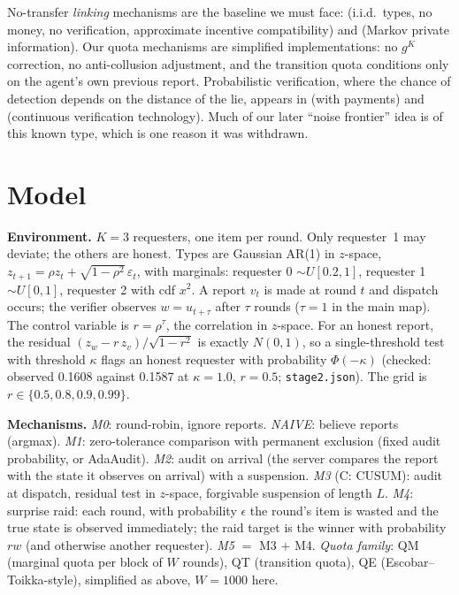 \documentclass[10pt]{article}
\begin{document}
No-transfer \emph{linking} mechanisms are the baseline we must face: \citet{jackson2007} (i.i.d.\ types, no money, no verification, approximate incentive compatibility) and \citet{escobar2013} (Markov private information). Our quota mechanisms are simplified implementations: no $g^K$ correction, no anti-collusion adjustment, and the transition quota conditions only on the agent's own previous report. Probabilistic verification, where the chance of detection depends on the distance of the lie, appears in \citet{caragiannis2012} (with payments) and \citet{ball2025} (continuous verification technology). Much of our later ``noise frontier'' idea is of this known type, which is one reason it was withdrawn.

\section{Model}\label{sec:model}
\textbf{Environment.} $K{=}3$ requesters, one item per round. Only requester~1 may deviate; the others are honest. Types are Gaussian AR(1) in $z$-space, $z_{t+1}=\rho z_t+\sqrt{1-\rho^2}\,\varepsilon_t$, with marginals: requester 0 $\sim U[0.2,1]$, requester 1 $\sim U[0,1]$, requester 2 with cdf $x^2$. A report $v_t$ is made at round $t$ and dispatch occurs; the verifier observes $w=u_{t+\tau}$ after $\tau$ rounds ($\tau{=}1$ in the main map). The control variable is $r=\rho^\tau$, the correlation in $z$-space. For an honest report, the residual $(z_w-r\,z_v)/\sqrt{1-r^2}$ is exactly $N(0,1)$, so a single-threshold test with threshold $\kappa$ flags an honest requester with probability $\Phi(-\kappa)$ (checked: observed 0.1608 against 0.1587 at $\kappa{=}1.0$, $r{=}0.5$; \texttt{stage2.json}). The grid is $r\in\{0.5,0.8,0.9,0.99\}$.

\textbf{Mechanisms.} \emph{M0}: round-robin, ignore reports. \emph{NAIVE}: believe reports (argmax). \emph{M1}: zero-tolerance comparison with permanent exclusion (fixed audit probability, or AdaAudit). \emph{M2}: audit on arrival (the server compares the report with the state it observes on arrival) with a suspension. \emph{M3} (C: CUSUM): audit at dispatch, residual test in $z$-space, forgivable suspension of length $L$. \emph{M4}: surprise raid: each round, with probability $\epsilon$ the round's item is wasted and the true state is observed immediately; the raid target is the winner with probability $rw$ (and otherwise another requester). \emph{M5} $=$ M3 $+$ M4. \emph{Quota family}: QM (marginal quota per block of $W$ rounds), QT (transition quota), QE (Escobar--Toikka-style), simplified as above, $W{=}1000$ here.
\end{document}

